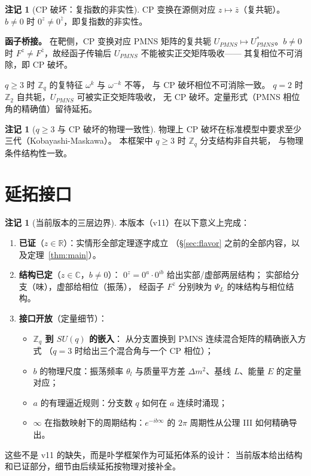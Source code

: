 \documentclass[11pt]{ctexart}
\theoremstyle{plain}
\theoremstyle{definition}
\newtheorem{rem}[thm]{注记}
\begin{document}
\begin{rem}[CP 破坏：复指数的非实性]\label{rem:cp}
CP 变换在源侧对应 $z\mapsto\bar z$（复共轭）。
$b\neq 0$ 时 $0^z\neq 0^{\bar z}$，即复指数的非实性。

\textbf{函子桥接。} 在靶侧，CP 变换对应 PMNS 矩阵的复共轭
$U_{PMNS}\mapsto U_{PMNS}^*$。$b\neq 0$ 时
$F^z\neq F^{\bar z}$，故经函子传输后
$U_{PMNS}$ 不能被实正交矩阵吸收——
其复相位不可消除，即 CP 破坏。

$q\geq 3$ 时 $\mathbb{Z}_q$ 的复特征 $\omega^k$ 与 $\omega^{-k}$ 不等，
与 CP 破坏相位不可消除一致。
$q = 2$ 时 $\mathbb{Z}_2$ 自共轭，$U_{PMNS}$ 可被实正交矩阵吸收，
无 CP 破坏。定量形式（PMNS 相位角的精确值）留待延拓。
\end{rem}

\begin{rem}[$q\geq 3$ 与 CP 破坏的物理一致性]\label{rem:km}
物理上 CP 破坏在标准模型中要求至少三代（Kobayashi-Maskawa）。
本框架中 $q\geq 3$ 时 $\mathbb{Z}_q$ 分支结构非自共轭，
与物理条件结构性一致。
\end{rem}

\section{延拓接口}\label{sec:extension}

\begin{rem}[当前版本的三层边界]\label{rem:boundary}
本版本（v11）在以下意义上完成：
\begin{enumerate}
\item \textbf{已证}（$z\in\mathbb{R}$）：实情形全部定理逐字成立
（\S\ref{sec:flavor} 之前的全部内容，以及定理~\ref{thm:main}）。
\item \textbf{结构已定}（$z\in\mathbb{C}$，$b\neq 0$）：
$0^z = 0^a\cdot 0^{ib}$ 给出实部/虚部两层结构；
实部给分支（味），虚部给相位（振荡），
经函子 $F^z$ 分别映为 $\Psi_L$ 的味结构与相位结构。
\item \textbf{接口开放}（定量细节）：
  \begin{itemize}
  \item \textbf{$\mathbb{Z}_q$ 到 $SU(q)$ 的嵌入}：
  从分支置换到 PMNS 连续混合矩阵的精确嵌入方式
  （$q=3$ 时给出三个混合角与一个 CP 相位）；
  \item $b$ 的物理尺度：振荡频率 $\theta_l$ 与质量平方差
  $\Delta m^2$、基线 $L$、能量 $E$ 的定量对应；
  \item $a$ 的有理逼近规则：分支数 $q$ 如何在 $a$ 连续时涌现；
  \item $\infty$ 在指数映射下的周期结构：$e^{-ib\infty}$ 的
  $2\pi$ 周期性从公理 III 如何精确导出。
  \end{itemize}
\end{enumerate}
这些不是 v11 的缺失，而是卟学框架作为可延拓体系的设计：
当前版本给出结构和已证部分，细节由后续延拓按物理对接补全。
\end{rem}
\end{document}
